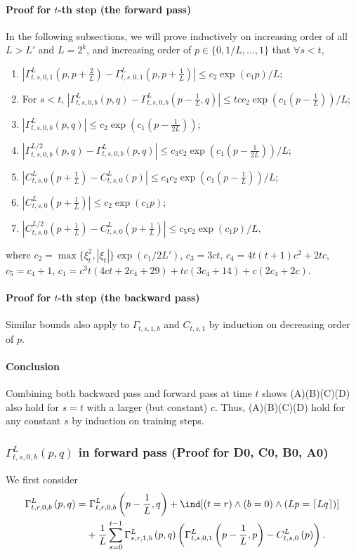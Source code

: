 \paragraph{Proof for $t$-th step (the forward pass)}
In the following subsections, we will prove inductively on increasing order of all $L > L'$ and $L=2^k$, and increasing order of $p\in \{0, 1/L, \ldots, 1\}$ that $\forall s< t$, 
\begin{enumerate}
    \item[(D0)] $|\Gamma^L_{t,s,0,1}(p,p+\frac2L)-\Gamma^L_{t,s,0,1}(p,p+\frac1L)|\leq c_2\exp(c_1 p)/L$;
    \item[(C0)] For $s < t$,
    $|\Gamma^{L}_{t,s,0,b}(p,q) - \Gamma^{L}_{t,s,0,b}(p-\frac1L,q) |\leq tcc_2 \exp(c_1 (p-\frac1L)) / L$;
    \item[(B0)] $|\Gamma^{L}_{t,s,0,b}(p,q)|\leq c_2 \exp(c_1 (p-\frac{1}{2L}))$;
    \item[(A0)] $|\Gamma^{L/2}_{t,s,0,b}(p,q) - \Gamma^L_{t,s,0,b}(p,q)|\leq c_3c_2 \exp(c_1 (p-\frac{1}{2L})) / L$;
    \item[(C1)] $|C^{L}_{t,s,0}(p+\frac1L) - C^{L}_{t,s,0}(p)|\leq c_4  c_2\exp(c_1 (p-\frac1L))/L$;
    \item[(B1)] $|C^L_{t,s,0}(p+\frac1L)|\leq c_2 \exp(c_1 p)$;
    \item[(A1)] $|C^{L/2}_{t,s,0}(p+\frac1L) - C^L_{t,s,0}(p+\frac1L)|\leq c_5 c_2 \exp(c_1 p) / L,$
\end{enumerate}
where $c_2 =\max\{\xi_t^2 , |\xi_t|\} \exp(c_1/{2L'})$, $c_3=3ct$, $c_4=4t(t+1)c^2+2tc$, $c_5=c_4+1$, $c_1=c^3t(4ct+2c_4+29) + tc(3c_4+14)+c(2c_4+2c)$.

\paragraph{Proof for $t$-th step (the backward pass)} Similar bounds also apply to $\Gamma_{t,s,1,b}$ and $C_{t,s,1}$ by induction on decreasing order of $p$. 

\paragraph{Conclusion} Combining both backward pass and forward pass at time $t$ shows (A)(B)(C)(D) also hold for $s=t$ with a larger (but constant) $c$. Thus, (A)(B)(C)(D) hold for any constant $s$ by induction on training steps. 

\subsubsection{$\Gamma^{L}_{t,s,0,b}(p,q)$ in forward pass (Proof for D0, C0, B0, A0)}
We first consider
\begin{align*} 
     \Gamma^L_{t,r,0,b}\left(p, q\right) = &~\Gamma^L_{t,r,0,b}\left(p-\frac1L, q\right) + \ind[(t=r) \wedge (b=0) \wedge (Lp=\lceil L q\rceil)] \\
     & + \frac1L \sum_{s=0}^{t-1} \Gamma^L_{s,r,1,b}\left(p, q\right)\left(\Gamma^L_{t,s,0,1}\left(p-\frac1L, p\right)-C^L_{t,s,0}\left(p\right)\right).
\end{align*}
